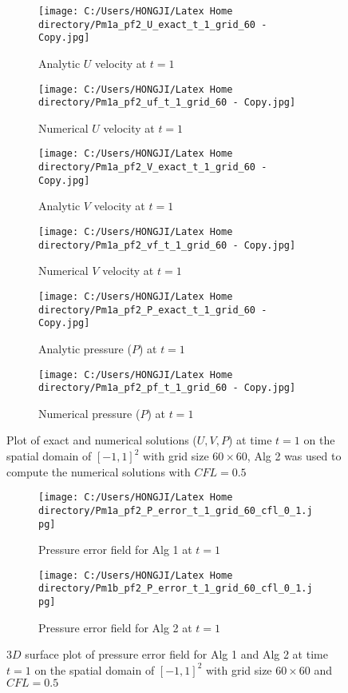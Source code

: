 \begin{figure}[H]
	\centering
	\begin{subfigure}[t]{2.5in}
		\centering
		\texttt{[image: C:/Users/HONGJI/Latex Home directory/Pm1a\_pf2\_U\_exact\_t\_1\_grid\_60 - Copy.jpg]}
		\caption{Analytic $U$ velocity at $t=1$}\label{fig:6.1a}		
	\end{subfigure}
	\quad
	\begin{subfigure}[t]{2.5in}
		\centering
		\texttt{[image: C:/Users/HONGJI/Latex Home directory/Pm1a\_pf2\_uf\_t\_1\_grid\_60 - Copy.jpg]}
		\caption{Numerical $U$ velocity at $t=1$}\label{fig:6.1b}
	\end{subfigure}
	\quad
	\begin{subfigure}[t]{2.5in}
		\centering
		\texttt{[image: C:/Users/HONGJI/Latex Home directory/Pm1a\_pf2\_V\_exact\_t\_1\_grid\_60 - Copy.jpg]}
		\caption{Analytic $V$ velocity at $t=1$}\label{fig:6.1c}
	\end{subfigure}
	\quad
	\begin{subfigure}[t]{2.5in}
		\centering
		\texttt{[image: C:/Users/HONGJI/Latex Home directory/Pm1a\_pf2\_vf\_t\_1\_grid\_60 - Copy.jpg]}
		\caption{Numerical $V$ velocity at $t=1$}\label{fig:6.1d}
	\end{subfigure}
	\quad	
	\begin{subfigure}[t]{2.5in}
		\centering
		\texttt{[image: C:/Users/HONGJI/Latex Home directory/Pm1a\_pf2\_P\_exact\_t\_1\_grid\_60 - Copy.jpg]}
		\caption{Analytic pressure ($P$) at $t=1$}\label{fig:6.1e}
	\end{subfigure}
	\quad	
	\begin{subfigure}[t]{2.5in}
		\centering
		\texttt{[image: C:/Users/HONGJI/Latex Home directory/Pm1a\_pf2\_pf\_t\_1\_grid\_60 - Copy.jpg]}
		\caption{Numerical pressure ($P$) at $t=1$}\label{fig:6.1f}
	\end{subfigure}
	\caption{Plot of exact and numerical solutions ($U,V,P$) at time $t=1$ on the spatial domain of $[-1,1]^2$ with grid size $60 \times 60$, Alg 2 was used to compute the numerical solutions with $CFL=0.5$}\label{fig:6.1}
\end{figure}

\begin{figure}[H]
	\centering
	\begin{subfigure}[t]{2.5in}
		\centering
		\texttt{[image: C:/Users/HONGJI/Latex Home directory/Pm1a\_pf2\_P\_error\_t\_1\_grid\_60\_cfl\_0\_1.jpg]}
		\caption{Pressure error field for Alg 1 at $t=1$ }\label{fig:6.2a}		
	\end{subfigure}
	\quad
	\begin{subfigure}[t]{2.5in}
		\centering
		\texttt{[image: C:/Users/HONGJI/Latex Home directory/Pm1b\_pf2\_P\_error\_t\_1\_grid\_60\_cfl\_0\_1.jpg]}
		\caption{Pressure error field for Alg 2 at $t=1$}\label{fig:6.2b}
	\end{subfigure}
	\caption{$3D$ surface plot of pressure error field for Alg 1 and Alg 2 at time $t=1$ on the spatial domain of $[-1,1]^2$ with grid size $60 \times 60$ and $CFL=0.5$}\label{fig:6.2}
\end{figure}

